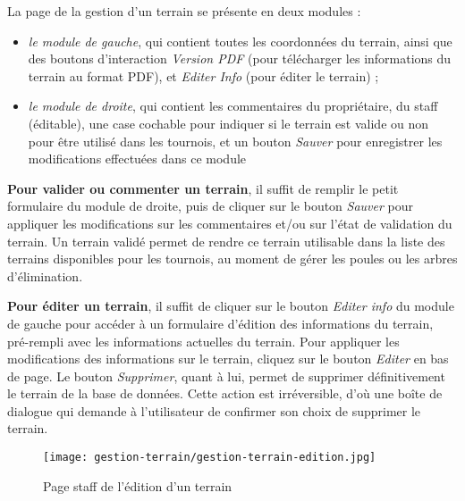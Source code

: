 La page de la gestion d'un terrain se présente en deux modules :

\begin{itemize}
\item \textit{le module de gauche}, qui contient toutes les coordonnées du terrain, ainsi que des boutons d'interaction \textit{Version PDF} (pour télécharger les informations du terrain au format PDF), et \textit{Editer Info} (pour éditer le terrain) ;
\item \textit{le module de droite}, qui contient les commentaires du propriétaire, du staff (éditable), une case cochable pour indiquer si le terrain est valide ou non pour être utilisé dans les tournois, et un bouton \textit{Sauver} pour enregistrer les modifications effectuées dans ce module
\end{itemize}
\bigskip

\textbf{Pour valider ou commenter un terrain}, il suffit de remplir le petit formulaire du module de droite, puis de cliquer sur le bouton \textit{Sauver} pour appliquer les modifications sur les commentaires et/ou sur l'état de validation du terrain. Un terrain validé permet de rendre ce terrain utilisable dans la liste des terrains disponibles pour les tournois, au moment de gérer les poules ou les arbres d'élimination.\newline

\textbf{Pour éditer un terrain}, il suffit de cliquer sur le bouton \textit{Editer info} du module de gauche pour accéder à un formulaire d'édition des informations du terrain, pré-rempli avec les informations actuelles du terrain. Pour appliquer les modifications des informations sur le terrain, cliquez sur le bouton \textit{Editer} en bas de page. Le bouton \textit{Supprimer}, quant à lui, permet de supprimer définitivement le terrain de la base de données. Cette action est irréversible, d'où une boîte de dialogue qui demande à l'utilisateur de confirmer son choix de supprimer le terrain.

\begin{figure}[H]
\centering
\texttt{[image: gestion-terrain/gestion-terrain-edition.jpg]}
\caption{Page staff de l'édition d'un terrain}
\end{figure}
